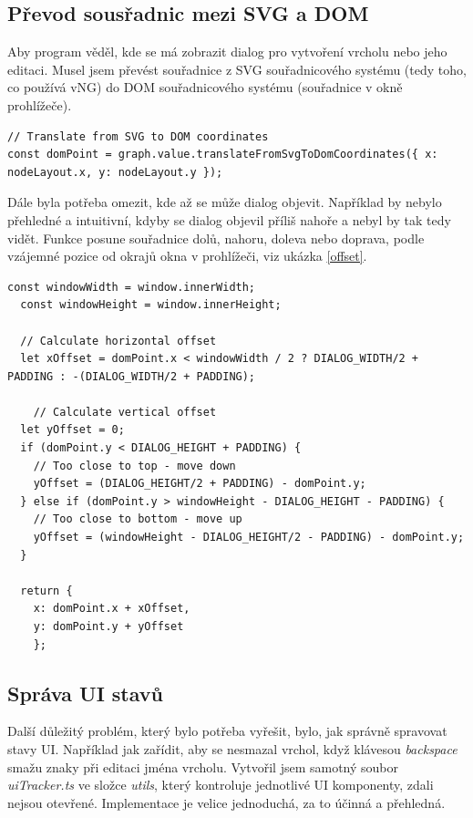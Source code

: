 \subsection{Převod sousřadnic mezi SVG a DOM}
Aby program věděl, kde se má zobrazit dialog pro vytvoření vrcholu nebo jeho editaci. Musel jsem převést souřadnice z SVG souřadnicového systému (tedy toho, co používá vNG) do DOM souřadnicového systému (souřadnice v okně prohlížeče).\cite{coords}
\begin{lstlisting}[style=JavaScript, firstnumber = 385, caption={components/MapNetwork.vue, převod z Svg souřadnic do Dom},
label = {coords}]
 // Translate from SVG to DOM coordinates
const domPoint = graph.value.translateFromSvgToDomCoordinates({ x: nodeLayout.x, y: nodeLayout.y });
\end{lstlisting}
Dále byla potřeba omezit, kde až se může dialog objevit. Například by nebylo přehledné a intuitivní, kdyby se dialog objevil příliš nahoře a nebyl by tak tedy vidět. Funkce posune souřadnice dolů, nahoru, doleva nebo doprava, podle vzájemné pozice od okrajů okna v prohlížeči, viz ukázka \ref{offset}. \cite{windowsize}
\begin{lstlisting}[style=JavaScript, firstnumber = 395, caption={components/MapNetwork.vue, výpočet offset dialogu},
label = {offset}]
  const windowWidth = window.innerWidth;
  const windowHeight = window.innerHeight;

  // Calculate horizontal offset
  let xOffset = domPoint.x < windowWidth / 2 ? DIALOG_WIDTH/2 + PADDING : -(DIALOG_WIDTH/2 + PADDING);
    
    // Calculate vertical offset
  let yOffset = 0;
  if (domPoint.y < DIALOG_HEIGHT + PADDING) {
    // Too close to top - move down
    yOffset = (DIALOG_HEIGHT/2 + PADDING) - domPoint.y;
  } else if (domPoint.y > windowHeight - DIALOG_HEIGHT - PADDING) {
    // Too close to bottom - move up
    yOffset = (windowHeight - DIALOG_HEIGHT/2 - PADDING) - domPoint.y;
  }
  
  return {
    x: domPoint.x + xOffset,
    y: domPoint.y + yOffset
    };
\end{lstlisting}
\newpage
\subsection{Správa UI stavů}
Další důležitý problém, který bylo potřeba vyřešit, bylo, jak správně spravovat stavy UI. Například jak zařídit, aby se nesmazal vrchol, když klávesou \textit{backspace} smažu znaky při editaci jména vrcholu. Vytvořil jsem samotný soubor \textit{uiTracker.ts} ve složce \textit{utils}, který kontroluje jednotlivé UI komponenty, zdali nejsou otevřené. Implementace je velice jednoduchá, za to účinná a přehledná.
